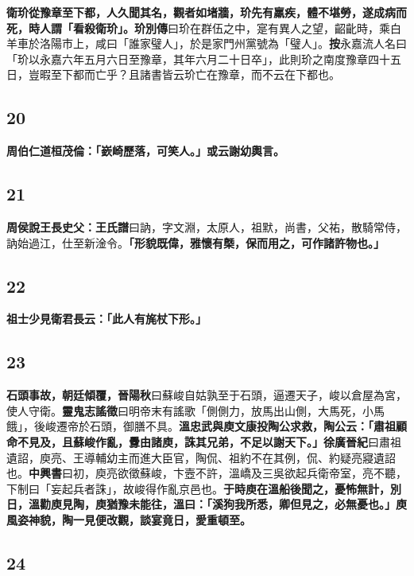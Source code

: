 \textbf{衛玠從豫章至下都，人久聞其名，觀者如堵牆，玠先有羸疾，體不堪勞，遂成病而死，時人謂「看殺衛玠」。}{\footnotesize \textbf{玠別傳}曰玠在群伍之中，寔有異人之望，齠齔時，乘白羊車於洛陽市上，咸曰「誰家璧人」，於是家門州黨號為「璧人」。\textbf{按}永嘉流人名曰「玠以永嘉六年五月六日至豫章，其年六月二十日卒」，此則玠之南度豫章四十五日，豈暇至下都而亡乎？且諸書皆云玠亡在豫章，而不云在下都也。}

\subsection*{20}

\textbf{周伯仁道桓茂倫：「嶔崎歷落，可笑人。」或云謝幼輿言。}

\subsection*{21}

\textbf{周侯說王長史父：}{\footnotesize \textbf{王氏譜}曰訥，字文淵，太原人，祖默，尚書，父祐，散騎常侍，訥始過江，仕至新淦令。}\textbf{「形貌既偉，雅懷有槩，保而用之，可作諸許物也。」}

\subsection*{22}

\textbf{祖士少見衛君長云：「此人有旄杖下形。」}

\subsection*{23}

\textbf{石頭事故，朝廷傾覆，}{\footnotesize \textbf{晉陽秋}曰蘇峻自姑孰至于石頭，逼遷天子，峻以倉屋為宮，使人守衛。\textbf{靈鬼志謠徵}曰明帝末有謠歌「側側力，放馬出山側，大馬死，小馬餓」，後峻遷帝於石頭，御膳不具。}\textbf{溫忠武與庾文康投陶公求救，陶公云：「肅祖顧命不見及，且蘇峻作亂，釁由諸庾，誅其兄弟，不足以謝天下。」}{\footnotesize \textbf{徐廣晉紀}曰肅祖遺詔，庾亮、王導輔幼主而進大臣官，陶侃、祖約不在其例，侃、約疑亮寢遺詔也。\textbf{中興書}曰初，庾亮欲徵蘇峻，卞壼不許，溫嶠及三吳欲起兵衛帝室，亮不聽，下制曰「妄起兵者誅」，故峻得作亂京邑也。}\textbf{于時庾在溫船後聞之，憂怖無計，別日，溫勸庾見陶，庾猶豫未能往，溫曰：「溪狗我所悉，卿但見之，必無憂也。」庾風姿神貌，陶一見便改觀，談宴竟日，愛重頓至。}

\subsection*{24}

